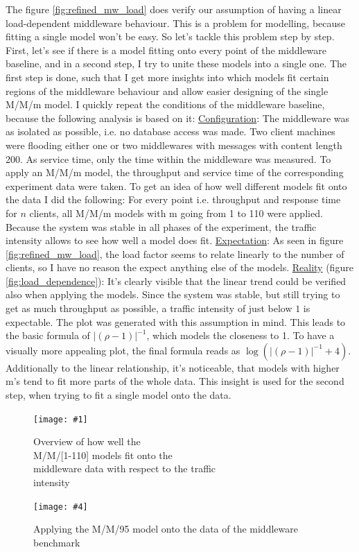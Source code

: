 \documentclass[11pt]{article}
\newcommand\TwoFig[6]{%
	\sbox\IBoxA{\texttt{[image: \#1]}}
	\sbox\IBoxB{\texttt{[image: \#4]}}%
	\ifdim\ht\IBoxA>\ht\IBoxB
	\setlength\IHeight{\ht\IBoxB}\else\setlength\IHeight{\ht\IBoxA}\fi%
	\begin{figure}[!htb]
		\minipage[t]{0.5\textwidth}\centering
		\texttt{[image: \#1]}
		\caption{#2}\label{#3}
		\endminipage \hfill
		\minipage[t]{0.5\textwidth}\centering
		\texttt{[image: \#4]}
		\caption{#5}\label{#6}
		\endminipage
	\end{figure}%
}
\begin{document}
The figure \ref{fig:refined_mw_load} does verify our assumption of having a linear load-dependent middleware behaviour. This is a problem for modelling, because fitting a single model won't be easy. So let's tackle this problem step by step. First, let's see if there is a model fitting onto every point of the middleware baseline, and in a second step, I try to unite these models into a single one. The first step is done, such that I get more insights into which models fit certain regions of the middleware behaviour and allow easier designing of the single M/M/m model. I quickly repeat the conditions of the middleware baseline, because the following analysis is based on it:
\newline\underline{Configuration}: The middleware was as isolated as possible, i.e. no database access was made. Two client machines were flooding either one or two middlewares with messages with content length 200. As service time, only the time within the middleware was measured. To apply an M/M/m model, the throughput and service time of the corresponding experiment data were taken. To get an idea of how well different models fit onto the data I did the following: For every point i.e. throughput and response time for $n$ clients, all M/M/m models with m going from 1 to 110 were applied. Because the system was stable in all phases of the experiment, the traffic intensity allows to see how well a model does fit.
\newline\underline{Expectation}: As seen in figure \ref{fig:refined_mw_load}, the load factor seems to relate linearly to the number of clients, so I have no reason the expect anything else of the models.
\newline\underline{Reality} (figure \ref{fig:load_dependence}): It's clearly visible that the linear trend could be verified also when applying the models. Since the system was stable, but still trying to get as much throughput as possible, a traffic intensity of just below $1$ is expectable. The plot was generated with this assumption in mind. This leads to the basic formula of $|(\rho-1)|^{-1}$, which models the closeness to 1. To have a visually more appealing plot, the final formula reads as $\log(|(\rho-1)|^{-1}+4)$. Additionally to the linear relationship, it's noticeable, that models with higher m's tend to fit more parts of the whole data. This insight is used for the second step, when trying to fit a single model onto the data.

\TwoFig {figures/middleware/load_dependence} {Overview of how well the \\M/M/[1-110] models fit onto the\\ middleware data with respect to the traffic\\ intensity} {fig:load_dependence}
		{figures/middleware/mm95} {Applying the M/M/95 model onto the data of the middleware benchmark} {fig:mm95}
\end{document}
